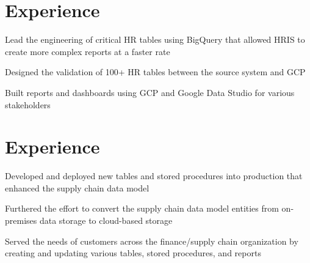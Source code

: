 \documentclass[]{plushcv}
\begin{document}
%
%



%
%

\begin{minipage}[t]{0.70\textwidth} 



\section{Experience}
\vspace{\topsep} %
\begin{tightemize}
\sectionsep
\item Lead the engineering of critical HR tables using BigQuery that allowed HRIS to create more complex reports at a faster rate
\item Designed the validation of 100+ HR tables between the source system and GCP 
\item Built reports and dashboards using GCP and Google Data Studio for various stakeholders
\end{tightemize}
\sectionsep

\section{Experience}
\vspace{\topsep} %
\begin{tightemize}
\sectionsep
\item Developed and deployed new tables and stored procedures into production that enhanced the supply chain data model 
\item Furthered the effort to convert the supply chain data model entities from on-premises data storage to cloud-based storage
\item Served the needs of customers across the finance/supply chain organization by creating and updating various tables, stored procedures, and reports
\end{tightemize}
\sectionsep


\end{minipage}
\end{document}
